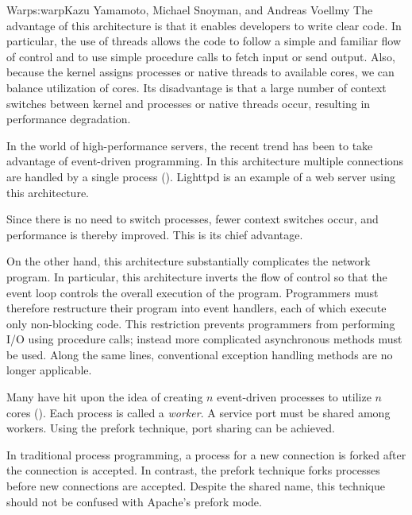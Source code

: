 \begin{aosachapter}{Warp}{s:warp}{Kazu Yamamoto, Michael Snoyman, and Andreas Voellmy}
The advantage of this architecture is that it enables developers to
write clear code. In particular, the use of threads allows the code to
follow a simple and familiar flow of control and to use simple procedure
calls to fetch input or send output. Also, because the kernel assigns
processes or native threads to available cores, we can balance
utilization of cores. Its disadvantage is that a large number of context
switches between kernel and processes or native threads occur, resulting
in performance degradation.


In the world of high-performance servers, the recent trend has been to
take advantage of event-driven programming. In this architecture
multiple connections are handled by a single process
(). Lighttpd is an example of a web server using
this architecture.


Since there is no need to switch processes, fewer context switches
occur, and performance is thereby improved. This is its chief advantage.

On the other hand, this architecture substantially complicates the
network program. In particular, this architecture inverts the flow of
control so that the event loop controls the overall execution of the
program. Programmers must therefore restructure their program into event
handlers, each of which execute only non-blocking code. This restriction
prevents programmers from performing I/O using procedure calls; instead
more complicated asynchronous methods must be used. Along the same
lines, conventional exception handling methods are no longer applicable.


Many have hit upon the idea of creating $n$ event-driven processes to
utilize $n$ cores (). Each process is called a
\emph{worker}. A service port must be shared among workers. Using the
prefork technique, port sharing can be achieved.

In traditional process programming, a process for a new connection is
forked after the connection is accepted. In contrast, the prefork
technique forks processes before new connections are accepted. Despite
the shared name, this technique should not be confused with Apache's
prefork mode.



\end{aosachapter}
